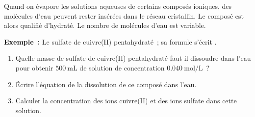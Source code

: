 Quand on évapore les solutions aqueuses de certains composés ioniques, des
molécules d'eau peuvent rester insérées dans le réseau cristallin. Le composé
est alors qualifié d'hydraté. Le nombre de molécules d'eau est variable.

\textbf{Exemple~:}
Le sulfate de cuivre(II) pentahydraté~; sa formule s'écrit
.
\begin{enumerate}
    \item Quelle masse de sulfate de cuivre(II) pentahydraté faut-il dissoudre
          dans l'eau pour obtenir $\qty{500}{\mL}$ de solution de concentration
          $\qty{0.040}{\mol\per\L}$~?
    \item Écrire l'équation de la dissolution de ce composé dans l'eau.
    \item Calculer la concentration des ions cuivre(II) et des ions sulfate dans
          cette solution.
\end{enumerate}

